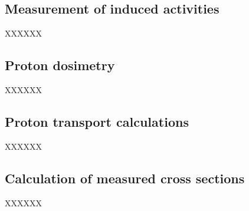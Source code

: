 \documentclass[3p]{elsarticle}
\newcommand{\pp}[1]{\left( #1\right)}
\newcommand{\comment}[1]{\todo[color=blue!20!white,inline]{ASV: #1}}
\begin{document}
\subsection{Measurement of induced activities}\label{sec:spectroscopy}

XXXXXX





\subsection{Proton dosimetry}\label{sec:dosimetry}


XXXXXX


\subsection{Proton transport calculations}\label{sec:proton_transport}

XXXXXX








\subsection{Calculation of measured cross sections}\label{sec:calcs_sec}


XXXXXX

 




 
\end{document}

